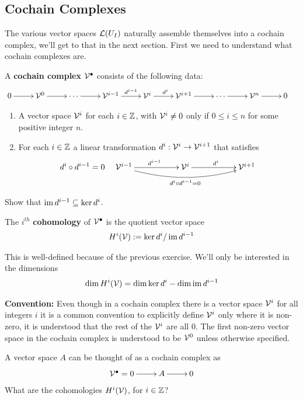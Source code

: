 \subsection{Cochain Complexes}
The various vector spaces $\mathcal{L}(U_I)$ naturally assemble themselves into a cochain complex, we'll get to that in the next section. First we need to understand what cochain complexes are.
\begin{definition}
  A \textbf{cochain complex} $ \mathcal{V}^\bullet$ consists of the following data:
  \begin{align*}
    &\xymatrix{0 \ar[r] & \V^0 \ar[r] & \cdots \ar[r] & \V^{i-1} \ar^-{d^{i-1}}[r] & \V^{i} \ar^{d^{i}}[r]& \V^{i+1} \ar[r] & \cdots \ar[r] & \V^n \ar[r] &0}
  \end{align*}
  \begin{enumerate}
    \item A vector space $ \mathcal{V}^i$ for each $ i \in \mathbb{Z}$, with $ \mathcal{V}^i \neq 0$  only if $ 0 \le i \le n$ for some positive integer $ n$.
    \item For each $ i \in \mathbb{Z}$ a linear transformation $ d^i: \mathcal{V}^i \rightarrow \mathcal{V}^{i+1}$ that satisfies
    \begin{align*}
      d^{i} \circ d^{i-1} = 0
      &&
      \xymatrix{
      \V^{i-1} \ar@/_1pc/_{d^{i} \circ d^{i-1} = 0}[rrrr] \ar^{d^{i-1}}[rr] && \V^i \ar^{d^{i}}[rr] && \V^{i+1}
      }
    \end{align*}
  \end{enumerate}
\end{definition}

\begin{ques}
  Show that $ \operatorname{im} d^{i-1} \subseteq \ker d^{i}$.
\end{ques}

\begin{definition}
  The $ i^{th}$ \textbf{cohomology} of $ \mathcal{V}^\bullet$ is the quotient vector space
    \begin{align*}
      H^i(\mathcal{V}) := \ker d^{i} / \operatorname{im} d^{i-1}
    \end{align*}
\end{definition}
\begin{remark}
  This is well-defined because of the previous exercise. We'll only be interested in the dimensions
  \begin{align*}
    \dim H^i(\mathcal{V}) = \dim \ker d^{i} - \dim \operatorname{im} d^{i-1}
  \end{align*}
\end{remark}
\noindent \textbf{Convention:} Even though in a cochain complex there is a vector space $ \mathcal{V}^i$ for all integers $ i$ it is a common convention to explicitly define $ \mathcal{V}^i$ only where it is non-zero, it is understood that the rest of the $ \mathcal{V}^i$ are all 0. The first non-zero vector space in the cochain complex is understood to be $ \mathcal{V}^0$ unless otherwise specified.
\begin{ques}
  A vector space $A$ can be thought of as a cochain complex as
  \begin{align*}
    \xymatrix{ \V^\bullet= 0 \ar[r] & A \ar[r] & 0}
  \end{align*}
  What are the cohomologies $ H^i(\mathcal{V})$, for $ i \in \mathbb{Z}$?
\end{ques}

